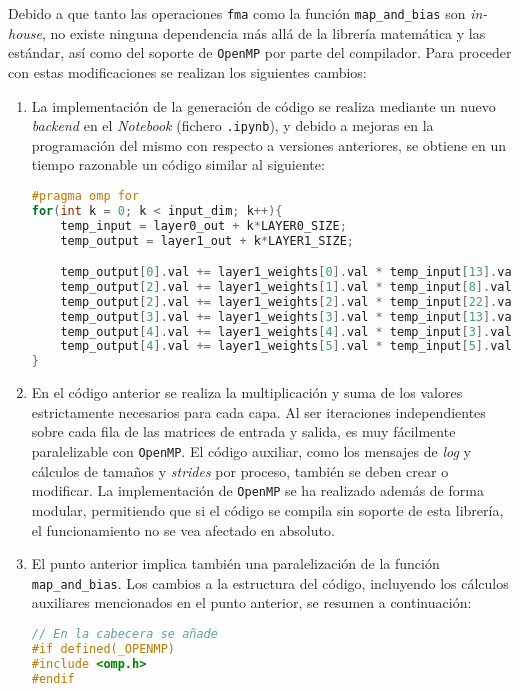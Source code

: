 Debido a que tanto las operaciones \texttt{\acrshort{fma}} como la función \texttt{map\_and\_bias} son \textit{in-house}, no existe ninguna dependencia más allá de la librería matemática y las estándar, así como del soporte de \texttt{OpenMP} por parte del compilador. Para proceder con estas modificaciones se realizan los siguientes cambios:
\begin{enumerate}
    \item La implementación de la generación de código se realiza mediante un nuevo \textit{backend} en el \textit{Notebook} (fichero \texttt{.ipynb}), y debido a mejoras en la programación del mismo con respecto a versiones anteriores, se obtiene en un tiempo razonable un código similar al siguiente:\medskip
\begin{lstlisting}[language=C]
#pragma omp for
for(int k = 0; k < input_dim; k++){
    temp_input = layer0_out + k*LAYER0_SIZE;
    temp_output = layer1_out + k*LAYER1_SIZE;

    temp_output[0].val += layer1_weights[0].val * temp_input[13].val;
    temp_output[2].val += layer1_weights[1].val * temp_input[8].val;
    temp_output[2].val += layer1_weights[2].val * temp_input[22].val;
    temp_output[3].val += layer1_weights[3].val * temp_input[13].val;
    temp_output[4].val += layer1_weights[4].val * temp_input[3].val;
    temp_output[4].val += layer1_weights[5].val * temp_input[5].val;
}
\end{lstlisting}
    \item En el código anterior se realiza la multiplicación y suma de los valores estrictamente necesarios para cada capa. Al ser iteraciones independientes sobre cada fila de las matrices de entrada y salida, es muy fácilmente paralelizable con \texttt{OpenMP}. El código auxiliar, como los mensajes de \textit{log} y cálculos de tamaños y \textit{strides} por proceso, también se deben crear o modificar. La implementación de \texttt{OpenMP} se ha realizado además de forma modular, permitiendo que si el código se compila sin soporte de esta librería, el funcionamiento no se vea afectado en absoluto.
    \item El punto anterior implica también una paralelización de la función \texttt{map\_and\_bias}. Los cambios a la estructura del código, incluyendo los cálculos auxiliares mencionados en el punto anterior, se resumen a continuación:\medskip
\begin{lstlisting}[language=C]
// En la cabecera se añade
#if defined(_OPENMP)
#include <omp.h>
#endif


\end{lstlisting}
\end{enumerate}
